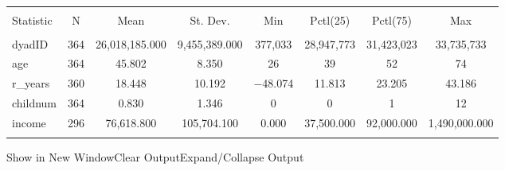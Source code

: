 \documentclass[
]{article}
\begin{document}
\begin{table}[!htbp] \centering 
  \caption{} 
  \label{} 
\begin{tabular}{@{\extracolsep{5pt}}lccccccc} 
\\[-1.8ex]\hline 
\hline \\[-1.8ex] 
Statistic & \multicolumn{1}{c}{N} & \multicolumn{1}{c}{Mean} & \multicolumn{1}{c}{St. Dev.} & \multicolumn{1}{c}{Min} & \multicolumn{1}{c}{Pctl(25)} & \multicolumn{1}{c}{Pctl(75)} & \multicolumn{1}{c}{Max} \\ 
\hline \\[-1.8ex] 
dyadID & 364 & 26,018,185.000 & 9,455,389.000 & 377,033 & 28,947,773 & 31,423,023 & 33,735,733 \\ 
age & 364 & 45.802 & 8.350 & 26 & 39 & 52 & 74 \\ 
r\_years & 360 & 18.448 & 10.192 & $-$48.074 & 11.813 & 23.205 & 43.186 \\ 
childnum & 364 & 0.830 & 1.346 & 0 & 0 & 1 & 12 \\ 
income & 296 & 76,618.800 & 105,704.100 & 0.000 & 37,500.000 & 92,000.000 & 1,490,000.000 \\ 
\hline \\[-1.8ex] 
\end{tabular} 
\end{table}

Show in New WindowClear OutputExpand/Collapse Output
\end{document}

